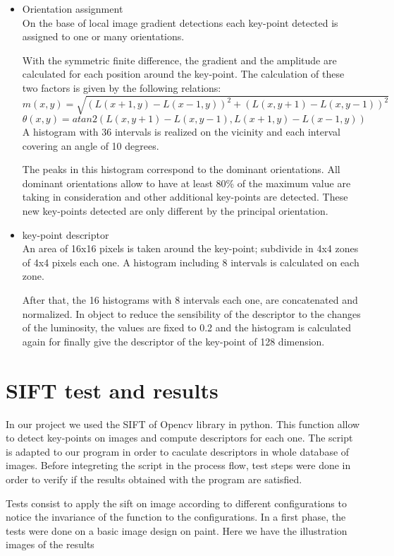 \documentclass[12pt]{article}
\begin{document}
\begin{itemize}
	
	\item Orientation assignment\\
	 On the base of local image gradient detections each key-point detected is assigned to one or many orientations. 

  With the symmetric finite difference, the gradient and the amplitude are calculated for each position around the key-point.
The calculation of these two factors is given by the following relations:
$$m(x,y)=\sqrt{(L(x+1,y)-L(x-1,y))^2+(L(x,y+1)-L(x,y-1))^2}$$
$$\theta(x,y)=atan2(L(x,y+1)-L(x,y-1),L(x+1,y)-L(x-1,y))$$
A histogram with 36 intervals is realized on the vicinity and each interval covering an angle of 10 degrees.

 The peaks in this histogram correspond to the dominant orientations. All dominant orientations allow to have at least 80\% of the maximum value are taking in consideration and other additional key-points are detected. These new key-points detected are only different by the principal orientation.

	\item key-point descriptor \\
An area of 16x16 pixels is taken around the key-point; subdivide in 4x4 zones of 4x4 pixels each one. A histogram including 8 intervals is calculated on each zone. 

After that, the 16 histograms with 8 intervals each one, are concatenated and normalized. In object to reduce the sensibility of the descriptor to the changes of the luminosity, the values are fixed to 0.2 and the histogram is calculated again for finally give the descriptor of the key-point of 128 dimension.
\end{itemize}

\section{ SIFT test and results}

In our project we used the SIFT  of  Opencv library in python. This function allow to detect key-points  on images and compute descriptors for each one.   
The script is adapted to our program in order to caculate  descriptors in whole database of images.
Before integreting the script in the process flow, test steps were done in order to verify if the results obtained with the program are satisfied.

Tests consist to apply the sift on image according to different configurations to notice the invariance of the function to the configurations.
In a first phase, the tests were done on a basic image design on paint. 
Here we have the illustration images  of the results
\end{document}
